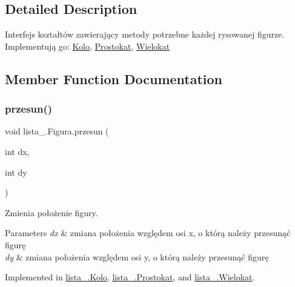 \subsection{Detailed Description}
Interfejs kształtów zawierający metody potrzebne każdej rysowanej figurze. Implementują go\+: \mbox{\hyperlink{classlista__5_1_1_kolo}{Kolo}}, \mbox{\hyperlink{classlista__5_1_1_prostokat}{Prostokat}}, \mbox{\hyperlink{classlista__5_1_1_wielokat}{Wielokat}} 

\subsection{Member Function Documentation}
\mbox{\label{interfacelista__5_1_1_figura_a72f085618cf604e8b1632ea733043861}} 
\subsubsection{\texorpdfstring{przesun()}{przesun()}}
{\footnotesize\ttfamily void lista\+\_.\+Figura.\+przesun (\begin{DoxyParamCaption}\item[{int}]{dx,  }\item[{int}]{dy }\end{DoxyParamCaption})}

Zmienia położenie figury. 
\begin{DoxyParams}{Parameters}
{\em dx} & zmiana położenia względem osi x, o którą należy przesunąć figurę \\
\hline
{\em dy} & zmiana położenia względem osi y, o którą należy przesunąć figurę \\
\hline
\end{DoxyParams}


Implemented in \mbox{\hyperlink{classlista__5_1_1_kolo_ab984e23d3e45dd5a63dfccf6aeaae01a}{lista\+\_.\+Kolo}}, \mbox{\hyperlink{classlista__5_1_1_prostokat_a9e8a5112287441debbfe24165a24d322}{lista\+\_.\+Prostokat}}, and \mbox{\hyperlink{classlista__5_1_1_wielokat_a565dc0340d5329d74e5f1f7d0eed1049}{lista\+\_.\+Wielokat}}.

\mbox{\label{interfacelista__5_1_1_figura_a1b238957bac675c57febc970067dfd6d}} 
